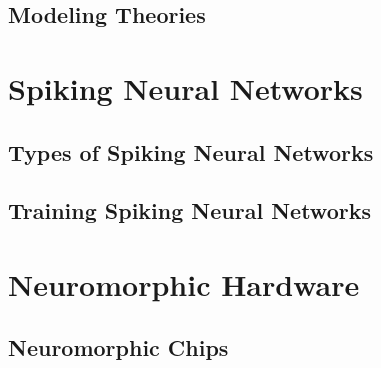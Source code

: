 \newpage
\chapter{Modeling Theories}\label{ch:mdlng-theo}


\part{Spiking Neural Networks}
\newpage
\chapter{Types of Spiking Neural Networks} \label{ch:snn-types}

\newpage

\newpage
\chapter{Training Spiking Neural Networks} \label{ch:snn-trng}


\part{Neuromorphic Hardware}
\newpage
\chapter{Neuromorphic Chips} \label{ch:neuro-chips}


